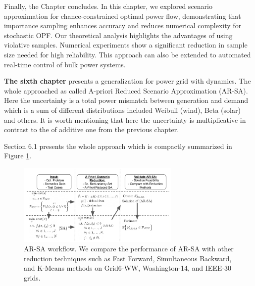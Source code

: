 Finally, the Chapter concludes. In this chapter, we explored scenario approximation for chance-constrained optimal power flow, demonstrating that importance sampling enhances accuracy and reduces numerical complexity for stochastic OPF.
Our theoretical analysis highlights the advantages of using violative samples. Numerical experiments show a significant reduction in sample size needed for high reliability. This approach can also be extended to automated real-time control of bulk power systems.

\textbf{The sixth chapter} presents a generalization for power grid with dynamics. The whole approached as called A-priori Reduced Scenario Approximation (AR-SA). Here the uncertainty is a total power mismatch between generation and demand which is a sum of different distributions included Weibull (wind), Beta (solar) and others. It is worth mentioning that here the uncertainty is multiplicative in contrast to the of additive one from the previous chapter.

Section 6.1 presents the whole approach which is compactly summarized in Figure \ref{fig:workflow}.

\begin{figure}
    \centering
    \hspace{-2mm}\includegraphics[width=0.7\textwidth]{Dissertation/images/dynamic//scheme.png}
    \caption{AR-SA workflow. We compare the performance of AR-SA with other reduction techniques such as Fast Forward, Simultaneous Backward, and K-Means methods on Grid6-WW, Washington-14, and IEEE-30 grids.}
    \label{fig:workflow}
    \vspace{-1mm}
\end{figure}

